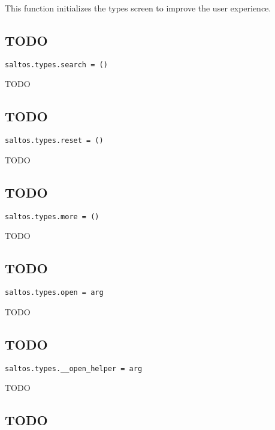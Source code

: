 \documentclass[a4paper]{book}
\begin{document}
This function initializes the types screen to improve the user experience.

\hypertarget{toc110}{}
\subsection{TODO}

\begin{lstlisting}
saltos.types.search = ()
\end{lstlisting}

TODO

\hypertarget{toc111}{}
\subsection{TODO}

\begin{lstlisting}
saltos.types.reset = ()
\end{lstlisting}

TODO

\hypertarget{toc112}{}
\subsection{TODO}

\begin{lstlisting}
saltos.types.more = ()
\end{lstlisting}

TODO

\hypertarget{toc113}{}
\subsection{TODO}

\begin{lstlisting}
saltos.types.open = arg
\end{lstlisting}

TODO

\hypertarget{toc114}{}
\subsection{TODO}

\begin{lstlisting}
saltos.types.__open_helper = arg
\end{lstlisting}

TODO

\hypertarget{toc115}{}
\subsection{TODO}
\end{document}
